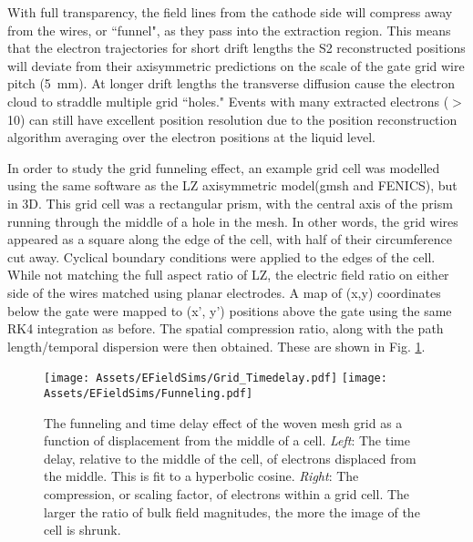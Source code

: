 With full transparency, the field lines from the cathode side will compress away from the wires, or ``funnel", as they pass into the extraction region. 
This means that the electron trajectories for short drift lengths the S2 reconstructed positions will deviate from their axisymmetric predictions on the scale of the gate grid wire pitch (5~mm).
At longer drift lengths the transverse diffusion 
cause the electron cloud to straddle multiple grid ``holes."
Events with many extracted electrons ($>$10) can still have excellent position resolution due to the position reconstruction algorithm averaging over the electron positions at the liquid level.

In order to study the grid funneling effect, an example grid cell was modelled using the same software as the LZ axisymmetric model(gmsh and FENICS), but in 3D.
This grid cell was a rectangular prism, with the central axis of the prism running through the middle of a hole in the mesh.
In other words, the grid wires appeared as a square along the edge of the cell, with half of their circumference cut away.
Cyclical boundary conditions were applied to the edges of the cell.
While not matching the full aspect ratio of LZ, the electric field ratio on either side of the wires matched using planar electrodes. 
A map of (x,y) coordinates below the gate were mapped to (x', y') positions above the gate using the same RK4 integration as before.
The spatial compression ratio, along with the path length/temporal dispersion were then obtained.
These are shown in Fig. \ref{fig:funneling}.

\begin{figure}
    \centering
    \texttt{[image: Assets/EFieldSims/Grid\_Timedelay.pdf]}
        \texttt{[image: Assets/EFieldSims/Funneling.pdf]}

    \caption[The funneling and time delay effect of the woven mesh grid as a function of displacement from the middle of a cell.]%
    {
  The funneling and time delay effect of the woven mesh grid as a function of displacement from the middle of a cell.
  \textit{Left}: The time delay, relative to the middle of the cell, of electrons displaced from the middle.
  This is fit to a hyperbolic cosine.
  \textit{Right}: The compression, or scaling factor, of electrons within a grid cell.
  The larger the ratio of bulk field magnitudes, the more the image of the cell is shrunk.
  }
    \label{fig:funneling}
\end{figure}

